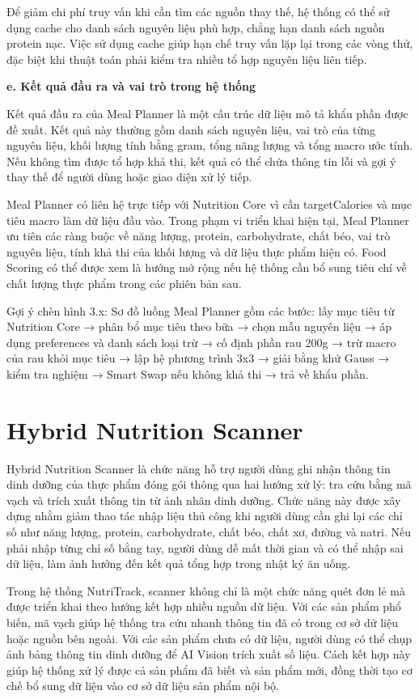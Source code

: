 \documentclass[12pt, a4paper]{report}
\begin{document}
Để giảm chi phí truy vấn khi cần tìm các nguồn thay thế, hệ thống có thể sử dụng cache cho danh sách nguyên liệu phù hợp, chẳng hạn danh sách nguồn protein nạc. Việc sử dụng cache giúp hạn chế truy vấn lặp lại trong các vòng thử, đặc biệt khi thuật toán phải kiểm tra nhiều tổ hợp nguyên liệu liên tiếp.

\textbf{e. Kết quả đầu ra và vai trò trong hệ thống}

Kết quả đầu ra của Meal Planner là một cấu trúc dữ liệu mô tả khẩu phần được đề xuất. Kết quả này thường gồm danh sách nguyên liệu, vai trò của từng nguyên liệu, khối lượng tính bằng gram, tổng năng lượng và tổng macro ước tính. Nếu không tìm được tổ hợp khả thi, kết quả có thể chứa thông tin lỗi và gợi ý thay thế để người dùng hoặc giao diện xử lý tiếp.

Meal Planner có liên hệ trực tiếp với Nutrition Core vì cần targetCalories và mục tiêu macro làm dữ liệu đầu vào. Trong phạm vi triển khai hiện tại, Meal Planner ưu tiên các ràng buộc về năng lượng, protein, carbohydrate, chất béo, vai trò nguyên liệu, tính khả thi của khối lượng và dữ liệu thực phẩm hiện có. Food Scoring có thể được xem là hướng mở rộng nếu hệ thống cần bổ sung tiêu chí về chất lượng thực phẩm trong các phiên bản sau.

Gợi ý chèn hình 3.x: Sơ đồ luồng Meal Planner gồm các bước: lấy mục tiêu từ Nutrition Core → phân bổ mục tiêu theo bữa → chọn mẫu nguyên liệu → áp dụng preferences và danh sách loại trừ → cố định phần rau 200g → trừ macro của rau khỏi mục tiêu → lập hệ phương trình 3x3 → giải bằng khử Gauss → kiểm tra nghiệm → Smart Swap nếu không khả thi → trả về khẩu phần.

\section{Hybrid Nutrition Scanner}Hybrid Nutrition Scanner là chức năng hỗ trợ người dùng ghi nhận thông tin dinh dưỡng của thực phẩm đóng gói thông qua hai hướng xử lý: tra cứu bằng mã vạch và trích xuất thông tin từ ảnh nhãn dinh dưỡng. Chức năng này được xây dựng nhằm giảm thao tác nhập liệu thủ công khi người dùng cần ghi lại các chỉ số như năng lượng, protein, carbohydrate, chất béo, chất xơ, đường và natri. Nếu phải nhập từng chỉ số bằng tay, người dùng dễ mất thời gian và có thể nhập sai dữ liệu, làm ảnh hưởng đến kết quả tổng hợp trong nhật ký ăn uống.

Trong hệ thống NutriTrack, scanner không chỉ là một chức năng quét đơn lẻ mà được triển khai theo hướng kết hợp nhiều nguồn dữ liệu. Với các sản phẩm phổ biến, mã vạch giúp hệ thống tra cứu nhanh thông tin đã có trong cơ sở dữ liệu hoặc nguồn bên ngoài. Với các sản phẩm chưa có dữ liệu, người dùng có thể chụp ảnh bảng thông tin dinh dưỡng để AI Vision trích xuất số liệu. Cách kết hợp này giúp hệ thống xử lý được cả sản phẩm đã biết và sản phẩm mới, đồng thời tạo cơ chế bổ sung dữ liệu vào cơ sở dữ liệu sản phẩm nội bộ.
\end{document}
